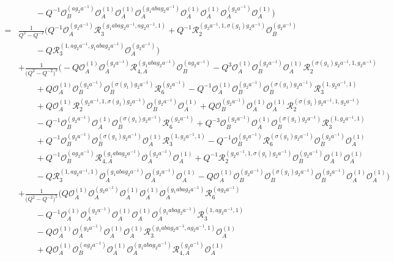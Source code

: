 \documentclass{amsart}
\newcommand{\Oa}{\mathcal O_A}
\newcommand{\Ob}{\mathcal O_B}
\newcommand{\R}{\mathcal R}
\begin{document}
\begin{align*}
&\qquad-Q^{-1}\Ob^{(ag_2a^{-1})}\Oa^{(1)}\Oa^{(1)}\Oa^{(g_1abag_2a^{-1})}\Oa^{(1)}\Oa^{(1)}\Oa^{(g_2a^{-1})}\Oa^{(1)}\Big)\\
=&\frac1{Q^2-Q^{-2}}\Big(Q^{-1}\Oa^{(g_2a^{-1})}\R_{3}^{(g_1abag_2a^{-1},ag_2a^{-1},1)}+Q^{-1}\R_{2}^{(g_2a^{-1},1,\sigma(g_1)g_2a^{-1})}\Ob^{(g_2a^{-1})}\\
&\qquad-Q\R_{3}^{(1,ag_2a^{-1},g_1abag_2a^{-1})}\Oa^{(g_2a^{-1})}\Big)\\
&+\frac1{\big(Q^2-Q^{-2}\big)^3}\Big(-Q\Oa^{(1)}\Oa^{(g_2a^{-1})}\R_{4,A}^{(g_1abag_2a^{-1})}\Ob^{(ag_2a^{-1})}-Q^3\Oa^{(1)}\Ob^{(g_2a^{-1})}\Oa^{(1)}\R_{2}^{(\sigma(g_1)g_2a^{-1},1,g_2a^{-1})}\\
&\qquad+Q\Oa^{(1)}\Ob^{(g_2a^{-1})}\Ob^{(\sigma(g_1)g_2a^{-1})}\R_{6}^{(g_2a^{-1})}-Q^{-1}\Oa^{(1)}\Ob^{(g_2a^{-1})}\Ob^{(\sigma(g_1)g_2a^{-1})}\R_{3}^{(1,g_2a^{-1},1)}\\
&\qquad+Q\Oa^{(1)}\R_{2}^{(g_2a^{-1},1,\sigma(g_1)g_2a^{-1})}\Ob^{(g_2a^{-1})}\Oa^{(1)}+Q\Ob^{(g_2a^{-1})}\Oa^{(1)}\Oa^{(1)}\R_{2}^{(\sigma(g_1)g_2a^{-1},1,g_2a^{-1})}\\
&\qquad-Q^{-1}\Ob^{(g_2a^{-1})}\Oa^{(1)}\Ob^{(\sigma(g_1)g_2a^{-1})}\R_{6}^{(g_2a^{-1})}+Q^{-3}\Ob^{(g_2a^{-1})}\Oa^{(1)}\Ob^{(\sigma(g_1)g_2a^{-1})}\R_{3}^{(1,g_2a^{-1},1)}\\
&\qquad+Q^{-1}\Ob^{(g_2a^{-1})}\Ob^{(\sigma(g_1)g_2a^{-1})}\Oa^{(1)}\R_{3}^{(1,g_2a^{-1},1)}-Q^{-1}\Ob^{(g_2a^{-1})}\R_{6}^{(\sigma(g_1)g_2a^{-1})}\Ob^{(g_2a^{-1})}\Oa^{(1)}\\
&\qquad+Q^{-1}\Ob^{(ag_2a^{-1})}\R_{4,A}^{(g_1abag_2a^{-1})}\Oa^{(g_2a^{-1})}\Oa^{(1)}+Q^{-1}\R_{2}^{(g_2a^{-1},1,\sigma(g_1)g_2a^{-1})}\Ob^{(g_2a^{-1})}\Oa^{(1)}\Oa^{(1)}\\
&\qquad-Q\R_{3}^{(1,ag_2a^{-1},1)}\Oa^{(g_1abag_2a^{-1})}\Oa^{(g_2a^{-1})}\Oa^{(1)}-Q\Oa^{(1)}\Ob^{(g_2a^{-1})}\Ob^{(\sigma(g_1)g_2a^{-1})}\Ob^{(g_2a^{-1})}\Oa^{(1)}\Oa^{(1)}\Big)\\
&+\frac1{\big(Q^2-Q^{-2}\big)^5}\Big(Q\Oa^{(1)}\Oa^{(g_2a^{-1})}\Oa^{(1)}\Oa^{(1)}\Oa^{(g_1abag_2a^{-1})}\R_{6}^{(ag_2a^{-1})}\\
&\qquad-Q^{-1}\Oa^{(1)}\Oa^{(g_2a^{-1})}\Oa^{(1)}\Oa^{(1)}\Oa^{(g_1abag_2a^{-1})}\R_{3}^{(1,ag_2a^{-1},1)}\\
&\qquad-Q\Oa^{(1)}\Oa^{(g_2a^{-1})}\Oa^{(1)}\Oa^{(1)}\R_{3}^{(g_1abag_2a^{-1},ag_2a^{-1},1)}\Oa^{(1)}\\
&\qquad+Q\Oa^{(1)}\Ob^{(ag_2a^{-1})}\Oa^{(1)}\Oa^{(g_1abag_2a^{-1})}\R_{4,A}^{(g_2a^{-1})}\Oa^{(1)}\\

\end{align*}
\end{document}
